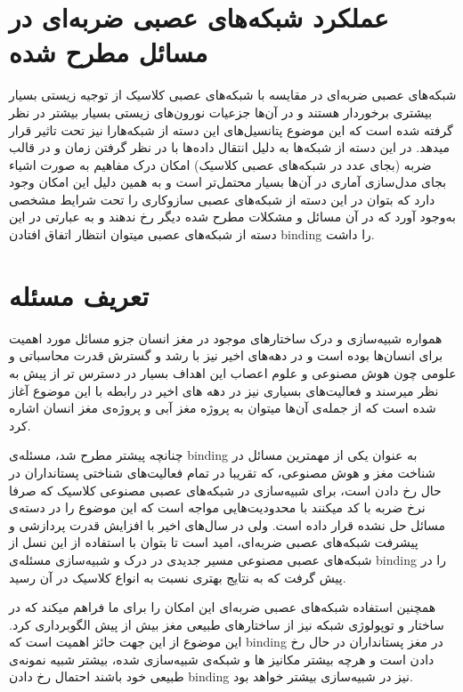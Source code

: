 \documentclass[12pt]{report}
\begin{document}
	\section{عملکرد شبکه‌های عصبی ضربه‌ای در مسائل مطرح شده}
	شبکه‌های عصبی ضربه‌ای در مقایسه با شبکه‌های عصبی کلاسیک از توجیه زیستی بسیار بیشتری برخوردار هستند و در آن‌ها جزعیات نورون‌های زیستی بسیار بیشتر در نظر گرفته شده است که این موضوع پتانسیل‌های این دسته از شبکه‌هارا نیز تحت تاثیر قرار میدهد. در این دسته از شبکه‌ها به دلیل انتقال داده‌ها با در نظر گرفتن زمان و در قالب ضربه (بجای عدد در شبکه‌‌های عصبی کلاسیک) امکان درک مفاهیم به صورت اشیاء بجای مدل‌سازی آماری در آن‌ها بسیار محتمل‌تر است و به همین دلیل این امکان وجود دارد که بتوان در این دسته از شبکه‌های عصبی سازوکاری را تحت شرایط مشخصی به‌وجود آورد که در آن مسائل و مشکلات مطرح شده دیگر رخ ندهند و به عبارتی در این دسته از شبکه‌های عصبی میتوان انتظار اتفاق افتادن \gls{binding} را داشت.
	
	\section{تعریف مسئله}
	همواره شبیه‌سازی و درک ساختار‌های موجود در مغز انسان جزو مسائل مورد اهمیت برای انسان‌ها بوده است و در دهه‌های اخیر نیز با رشد و گسترش قدرت محاسباتی و علومی چون هوش مصنوعی و علوم اعصاب این اهداف بسیار در دسترس تر از پیش به نظر میرسند و فعالیت‌های بسیاری نیز در دهه های اخیر در رابطه با این موضوع آغاز شده است که از جمله‌ی آن‌ها میتوان به پروژه مغز آبی و پروژه‌ی مغز انسان اشاره کرد.
	
	چنانچه پیشتر مطرح شد، مسئله‌ی \gls{binding} به عنوان یکی از مهمترین مسائل در شناخت مغز و هوش مصنوعی، که تقریبا در تمام فعالیت‌های شناختی پستانداران در حال رخ دادن است، برای شبیه‌سازی در شبکه‌های عصبی مصنوعی کلاسیک که صرفا نرخ ضربه با کد میکنند با محدودیت‌هایی مواجه است \cite{vonderMalsburg1999} که این موضوع را در دسته‌ی مسائل حل نشده قرار داده است. ولی در سال‌های اخیر با افزایش قدرت پردازشی و پیشرفت شبکه‌های عصبی ضربه‌ای‌، امید است تا بتوان با استفاده از این نسل از شبکه‌های عصبی مصنوعی مسیر جدیدی در درک و شبیه‌سازی مسئله‌ی \gls{binding} را در پیش گرفت که به نتایج بهتری نسبت به انواع کلاسیک در آن رسید.
	
	همچنین استفاده شبکه‌های عصبی ضربه‌ای این امکان را برای ما فراهم میکند که در ساختار و توپولوژی شبکه نیز از ساختار‌های طبیعی مغز بیش از پیش الگوبرداری کرد. این موضوع از این جهت  حائز اهمیت است که \gls{binding} در مغز پستانداران در حال رخ دادن است و هرچه بیشتر مکانیز ها و شبکه‌ی شبیه‌سازی شده، بیشتر شبیه نمونه‌ی طبیعی خود باشند احتمال رخ دادن \gls{binding} نیز در شبیه‌سازی بیشتر خواهد بود.
	
\end{document}
